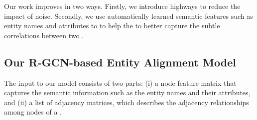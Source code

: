  Our work improves \RGCNs in two ways. Firstly, we introduce highways to reduce the impact of noise.
    Secondly, we use automatically learned semantic features such as entity names and attributes to to help the \RGCN to better capture the
    subtle correlations between two \KGs.




	
	
	\subsection{Our R-GCN-based Entity Alignment Model}
	\label{section:rgcn}	

  	The input to our \RGCN model consists of two parts: (i) a node feature matrix that captures the semantic information such as the entity
  names and their attributes, and (ii) a list of adjacency matrices, which describes the adjacency relationships among nodes of a \KG.


%

